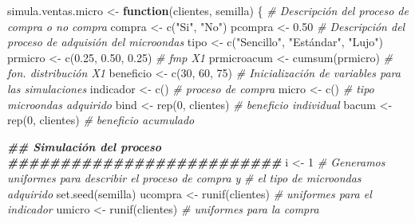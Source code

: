 \documentclass[
]{book}
\newenvironment{Shaded}{\begin{snugshade}}{\end{snugshade}}
\newcommand{\CommentTok}[1]{\textcolor[rgb]{0.56,0.35,0.01}{\textit{#1}}}
\newcommand{\ControlFlowTok}[1]{\textcolor[rgb]{0.13,0.29,0.53}{\textbf{#1}}}
\newcommand{\DecValTok}[1]{\textcolor[rgb]{0.00,0.00,0.81}{#1}}
\newcommand{\DocumentationTok}[1]{\textcolor[rgb]{0.56,0.35,0.01}{\textbf{\textit{#1}}}}
\newcommand{\FloatTok}[1]{\textcolor[rgb]{0.00,0.00,0.81}{#1}}
\newcommand{\FunctionTok}[1]{\textcolor[rgb]{0.00,0.00,0.00}{#1}}
\newcommand{\NormalTok}[1]{#1}
\newcommand{\OtherTok}[1]{\textcolor[rgb]{0.56,0.35,0.01}{#1}}
\newcommand{\StringTok}[1]{\textcolor[rgb]{0.31,0.60,0.02}{#1}}
\theoremstyle{definition}
\theoremstyle{definition}
\theoremstyle{definition}
\theoremstyle{definition}
\theoremstyle{remark}
\begin{document}
\begin{Shaded}
\begin{Highlighting}[]
\NormalTok{simula.ventas.micro }\OtherTok{\textless{}{-}} \ControlFlowTok{function}\NormalTok{(clientes, semilla)}
\NormalTok{\{}
\CommentTok{\# Descripción del proceso de compra o no compra}
\NormalTok{compra }\OtherTok{\textless{}{-}} \FunctionTok{c}\NormalTok{(}\StringTok{"Si"}\NormalTok{, }\StringTok{"No"}\NormalTok{)}
\NormalTok{pcompra }\OtherTok{\textless{}{-}} \FloatTok{0.50}
\CommentTok{\# Descripción del proceso de adquisión del microondas}
\NormalTok{tipo }\OtherTok{\textless{}{-}} \FunctionTok{c}\NormalTok{(}\StringTok{"Sencillo"}\NormalTok{, }\StringTok{"Estándar"}\NormalTok{, }\StringTok{"Lujo"}\NormalTok{)}
\NormalTok{prmicro }\OtherTok{\textless{}{-}} \FunctionTok{c}\NormalTok{(}\FloatTok{0.25}\NormalTok{, }\FloatTok{0.50}\NormalTok{, }\FloatTok{0.25}\NormalTok{) }\CommentTok{\# fmp X1}
\NormalTok{prmicroacum }\OtherTok{\textless{}{-}} \FunctionTok{cumsum}\NormalTok{(prmicro) }\CommentTok{\# fon. distribución X1}
\NormalTok{beneficio }\OtherTok{\textless{}{-}} \FunctionTok{c}\NormalTok{(}\DecValTok{30}\NormalTok{, }\DecValTok{60}\NormalTok{, }\DecValTok{75}\NormalTok{)}
\CommentTok{\# Inicialización de variables para las simulaciones}
\NormalTok{indicador }\OtherTok{\textless{}{-}} \FunctionTok{c}\NormalTok{()             }\CommentTok{\# proceso de compra}
\NormalTok{micro }\OtherTok{\textless{}{-}} \FunctionTok{c}\NormalTok{()                 }\CommentTok{\# tipo microondas adquirido}
\NormalTok{bind }\OtherTok{\textless{}{-}} \FunctionTok{rep}\NormalTok{(}\DecValTok{0}\NormalTok{, clientes)     }\CommentTok{\# beneficio individual}
\NormalTok{bacum }\OtherTok{\textless{}{-}} \FunctionTok{rep}\NormalTok{(}\DecValTok{0}\NormalTok{, clientes)    }\CommentTok{\# beneficio acumulado}

\DocumentationTok{\#\# Simulación del proceso}
\DocumentationTok{\#\#\#\#\#\#\#\#\#\#\#\#\#\#\#\#\#\#\#\#\#\#\#\#\#\#}
\NormalTok{i }\OtherTok{\textless{}{-}} \DecValTok{1}
\CommentTok{\# Generamos uniformes para describir el proceso de compra y }
\CommentTok{\# el tipo de microondas adquirido}
\FunctionTok{set.seed}\NormalTok{(semilla)}
\NormalTok{ucompra }\OtherTok{\textless{}{-}} \FunctionTok{runif}\NormalTok{(clientes) }\CommentTok{\# uniformes para el indicador}
\NormalTok{umicro }\OtherTok{\textless{}{-}} \FunctionTok{runif}\NormalTok{(clientes)  }\CommentTok{\# uniformes para la compra}


\end{Highlighting}
\end{Shaded}
\end{document}
